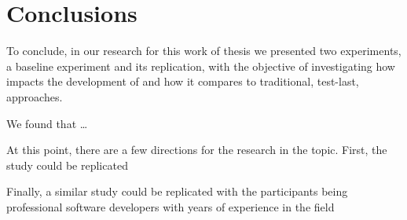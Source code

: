 \chapter{Conclusions}
To conclude, in our research for this work of thesis we presented two experiments, a baseline experiment and its replication, with the objective of investigating how \tdd impacts the development of \ess and how it compares to traditional, test-last, approaches.

We found that \dots

At this point, there are a few directions for the research in the topic. First, the study could be replicated 


Finally, a similar study could be replicated with the participants being professional software developers with years of experience in the \es field